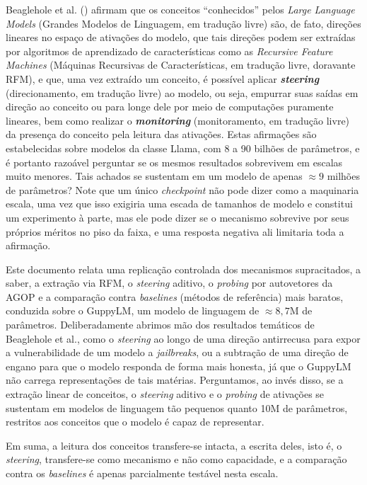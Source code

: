 Beaglehole et al. (\cite{beaglehole2026toward}) afirmam que os conceitos ``conhecidos'' pelos \textit{Large Language Models} (Grandes Modelos de Linguagem, em tradução livre) são, de fato, direções lineares no espaço de ativações do modelo, que tais direções podem ser extraídas por algoritmos de aprendizado de características como as \textit{Recursive Feature Machines} (Máquinas Recursivas de Características, em tradução livre, doravante RFM), e que, uma vez extraído um conceito, é possível aplicar \textbf{\textit{steering}} (direcionamento, em tradução livre) ao modelo, ou seja, empurrar suas saídas em direção ao conceito ou para longe dele por meio de computações puramente lineares, bem como realizar o \textbf{\textit{monitoring}} (monitoramento, em tradução livre) da presença do conceito pela leitura das ativações. Estas afirmações são estabelecidas sobre modelos da classe Llama, com 8 a 90 bilhões de parâmetros, e é portanto razoável perguntar se os mesmos resultados sobrevivem em escalas muito menores. Tais achados se sustentam em um modelo de apenas $\approx 9$ milhões de parâmetros? Note que um único \textit{checkpoint} não pode dizer como a maquinaria escala, uma vez que isso exigiria uma escada de tamanhos de modelo e constitui um experimento à parte, mas ele pode dizer se o mecanismo sobrevive por seus próprios méritos no piso da faixa, e uma resposta negativa ali limitaria toda a afirmação.

Este documento relata uma replicação controlada dos mecanismos supracitados, a saber, a extração via RFM, o \textit{steering} aditivo, o \textit{probing} por autovetores da AGOP e a comparação contra \textit{baselines} (métodos de referência) mais baratos, conduzida sobre o GuppyLM, um modelo de linguagem de $\approx 8{,}7$M de parâmetros. Deliberadamente abrimos mão dos resultados temáticos de Beaglehole et al., como o \textit{steering} ao longo de uma direção antirrecusa para expor a vulnerabilidade de um modelo a \textit{jailbreaks}, ou a subtração de uma direção de engano para que o modelo responda de forma mais honesta, já que o GuppyLM não carrega representações de tais matérias. Perguntamos, ao invés disso, se a extração linear de conceitos, o \textit{steering} aditivo e o \textit{probing} de ativações se sustentam em modelos de linguagem tão pequenos quanto 10M de parâmetros, restritos aos conceitos que o modelo é capaz de representar.

Em suma, a leitura dos conceitos transfere-se intacta, a escrita deles, isto é, o \textit{steering}, transfere-se como mecanismo e não como capacidade, e a comparação contra os \textit{baselines} é apenas parcialmente testável nesta escala.
